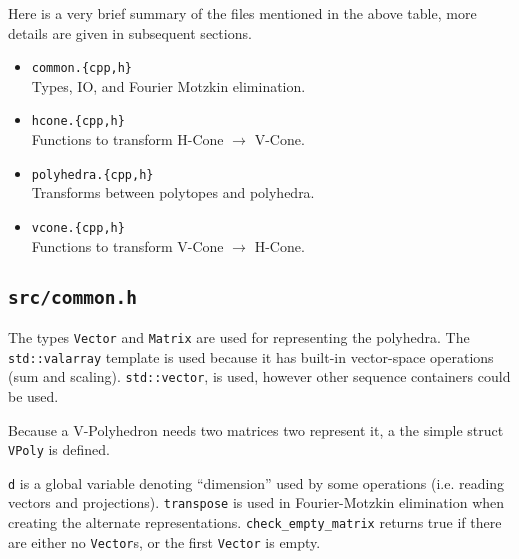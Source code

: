 \documentclass[fleqn]{article}
\newcommand{\0}{\vec{0}}
\begin{document}
\vspace{1em}

Here is a very brief summary of the files mentioned in the above table, more details are given in subsequent sections.

\begin{itemize}
  \item \texttt{common.\{cpp,h\}}\\
    Types, IO, and Fourier Motzkin elimination.
  \item \texttt{hcone.\{cpp,h\}}\\
    Functions to transform H-Cone $\to$ V-Cone.
  \item \texttt{polyhedra.\{cpp,h\}}\\
    Transforms between polytopes and polyhedra.
  \item \texttt{vcone.\{cpp,h\}}\\
    Functions to transform V-Cone $\to$ H-Cone.
\end{itemize}



\subsection{\texttt{src/common.h}}
 
The types \lstinline{Vector} and \lstinline{Matrix} are used for representing the polyhedra.  The \lstinline{std::valarray} template is used because it has built-in vector-space operations (sum and scaling).  \lstinline{std::vector}, is used, however other sequence containers could be used.

 
Because a V-Polyhedron needs two matrices two represent it, a the simple struct \lstinline{VPoly} is defined.

 
\lstinline{d} is a global variable denoting ``dimension'' used by some operations (i.e. reading vectors and projections).  \lstinline{transpose} is used in Fourier-Motzkin elimination when creating the alternate representations.  \lstinline{check_empty_matrix}  returns true if there are either no \lstinline{Vector}s, or the first \lstinline{Vector} is empty.
\end{document}
